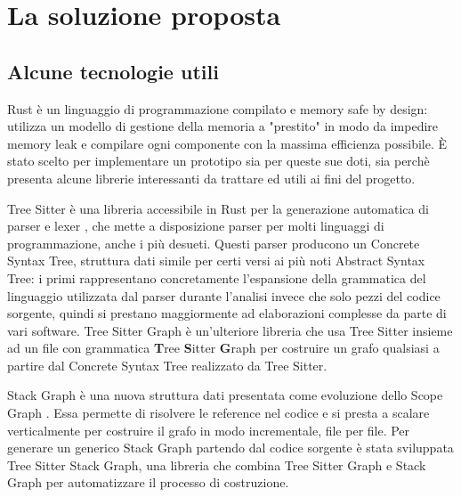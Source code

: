 \section{La soluzione proposta}
\subsection{Alcune tecnologie utili}


Rust \cite{blandy2017programming} \`e un linguaggio di programmazione compilato e memory safe by design: utilizza un modello di gestione della memoria a "prestito" in modo da impedire memory leak e compilare ogni componente con la massima efficienza possibile. \`E stato scelto per implementare un prototipo sia per queste sue doti, sia perch\`e presenta alcune librerie interessanti da trattare ed utili ai fini del progetto.


Tree Sitter \cite{TreeSitter} \`e una libreria accessibile in Rust per la generazione automatica di parser e lexer \cite{sestoft2017programming}, che mette a disposizione parser per molti linguaggi di programmazione, anche i pi\`u desueti. Questi parser producono un Concrete Syntax Tree, struttura dati simile per certi versi ai pi\`u noti Abstract Syntax Tree: i primi rappresentano concretamente l'espansione della grammatica del linguaggio utilizzata dal parser durante l'analisi invece che solo pezzi del codice sorgente, quindi si prestano maggiormente ad elaborazioni complesse da parte di vari software. Tree Sitter Graph \`e un'ulteriore libreria che usa Tree Sitter insieme ad un file con grammatica \textbf{T}ree \textbf{S}itter \textbf{G}raph per costruire un grafo qualsiasi a partire dal Concrete Syntax Tree realizzato da Tree Sitter.


Stack Graph \cite{StackGraph} \`e una nuova struttura dati presentata \cite{StackGraphNameResolutionAtScale} come evoluzione dello Scope Graph \cite{ScopeGraph}. Essa permette di risolvere le reference nel codice e si presta a scalare verticalmente per costruire il grafo in modo incrementale, file per file. Per generare un generico Stack Graph partendo dal codice sorgente \`e stata sviluppata Tree Sitter Stack Graph, una libreria che combina Tree Sitter Graph e Stack Graph per automatizzare il processo di costruzione.

